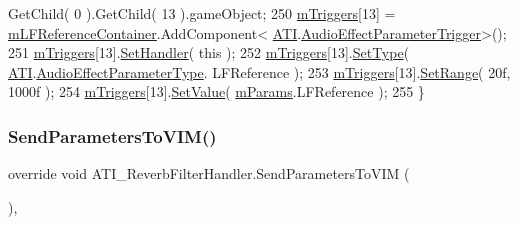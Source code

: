 \begin{DoxyCode}
      GetChild( 0 ).GetChild( 13 ).gameObject;
250         \hyperlink{class_a_t_i_1_1_audio_effect_handler_a1db04dc85daf07d045117d9bc585e944}{mTriggers}[13] = \hyperlink{class_a_t_i___reverb_filter_handler_ae9010ffdcbb124b62027df7d31feeecb}{mLFReferenceContainer}.AddComponent<
      \hyperlink{class_a_t_i}{ATI}.\hyperlink{class_a_t_i_1_1_audio_effect_parameter_trigger}{AudioEffectParameterTrigger}>();
251         \hyperlink{class_a_t_i_1_1_audio_effect_handler_a1db04dc85daf07d045117d9bc585e944}{mTriggers}[13].\hyperlink{class_a_t_i_1_1_audio_effect_parameter_trigger_a69dc7845ba6454981ce5454ca55b4cb1}{SetHandler}( \textcolor{keyword}{this} );
252         \hyperlink{class_a_t_i_1_1_audio_effect_handler_a1db04dc85daf07d045117d9bc585e944}{mTriggers}[13].\hyperlink{class_a_t_i_1_1_audio_effect_parameter_trigger_a12b9e1d13260a5970f5effed71b9a216}{SetType}( \hyperlink{class_a_t_i}{ATI}.\hyperlink{class_a_t_i_a1123d61b8dceb5867a3683e8d2224ee1}{AudioEffectParameterType}.
      LFReference );
253         \hyperlink{class_a_t_i_1_1_audio_effect_handler_a1db04dc85daf07d045117d9bc585e944}{mTriggers}[13].\hyperlink{class_a_t_i_1_1_audio_effect_parameter_trigger_a3b61498abf2b3e3c8cba23e296ff9273}{SetRange}( 20f, 1000f );
254         \hyperlink{class_a_t_i_1_1_audio_effect_handler_a1db04dc85daf07d045117d9bc585e944}{mTriggers}[13].\hyperlink{class_a_t_i_1_1_audio_effect_parameter_trigger_a07ec3a40faeed18c0d85abb035270292}{SetValue}( \hyperlink{class_a_t_i___reverb_filter_handler_a034260fbce2052b42bceddc891632347}{mParams}.LFReference );
255     \}
\end{DoxyCode}
\mbox{\label{class_a_t_i___reverb_filter_handler_aacb469dc3038fca616d638f6a5a04a30}} 
\subsubsection{\texorpdfstring{Send\+Parameters\+To\+V\+I\+M()}{SendParametersToVIM()}}
{\footnotesize\ttfamily override void A\+T\+I\+\_\+\+Reverb\+Filter\+Handler.\+Send\+Parameters\+To\+V\+IM (\begin{DoxyParamCaption}{ }\end{DoxyParamCaption})\hspace{0.3cm}{\ttfamily [protected]}, {\ttfamily [virtual]}}



